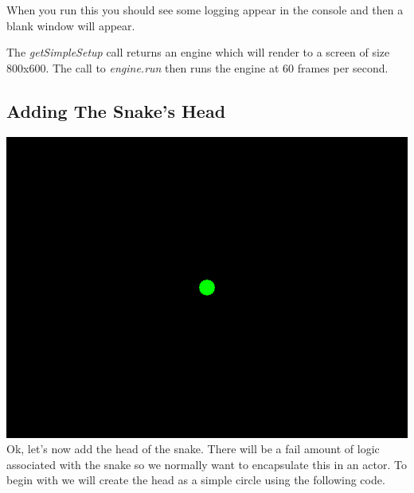 \documentclass[letterpaper,10pt,english]{sphinxmanual}
\begin{document}
When you run this you should see some logging appear in the console and then a blank window
will appear.

The \emph{getSimpleSetup} call returns an engine which will render to a screen of size 800x600. The
call to \emph{engine.run} then runs the engine at 60 frames per second.


\subsection{Adding The Snake's Head}
\label{tutorial-1:adding-the-snake-s-head}\includegraphics{ss-1-circle.png}
Ok, let's now add the head of the snake. There will be a fail amount of logic associated
with the snake so we normally want to encapsulate this in an actor. To begin with we
will create the head as a simple circle using the following code.
\end{document}
